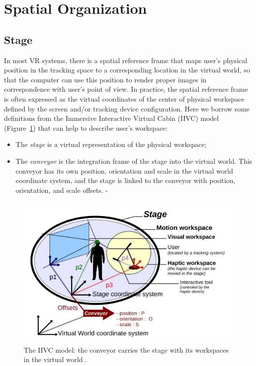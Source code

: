 

\section{Spatial Organization} 

\subsection{Stage}
\label{sec:stage}
In most VR systems, there is a spatial reference frame that maps user's physical position in the tracking space to a corresponding location in the virtual world, so that the computer can use this position to render proper images in correspondence with user's point of view. In practice, the spatial reference frame is often expressed as the virtual coordinates of the center of physical workspace defined by the screen and/or tracking device configuration. Here we borrow some definitions from the Immersive Interactive Virtual Cabin (IIVC) model (Figure~\ref{fig:2_iivc}) that can help to describe user's workspace:

\begin{itemize}
\item The \textit{stage} is a virtual representation of the physical workspace;
\item The \textit{conveyor} is the integration frame of the stage into the virtual world. This conveyor has its own position, orientation and scale in the virtual world coordinate system, and the stage is linked to the conveyor with position, orientation, and scale offsets.
-\end{itemize}

\begin{figure}[htb]
  \centering
  \includegraphics[width=.7\textwidth]{figures/ch2/IIVC}
  \caption{\label{fig:2_iivc}The IIVC model: the conveyor carries the stage with its workspaces in the virtual world \citep{Fleury2010Generic}.}
\end{figure}

